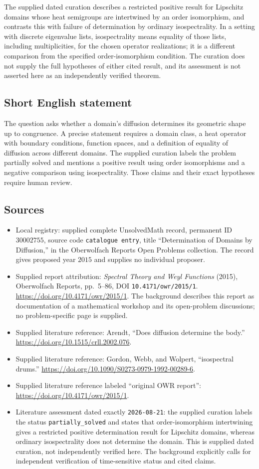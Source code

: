 \documentclass[11pt]{article}
\begin{document}
The supplied dated curation describes a restricted positive result for Lipschitz domains whose heat semigroups are intertwined by an order isomorphism, and contrasts this with failure of determination by ordinary isospectrality. In a setting with discrete eigenvalue lists, isospectrality means equality of those lists, including multiplicities, for the chosen operator realizations; it is a different comparison from the specified order-isomorphism condition. The curation does not supply the full hypotheses of either cited result, and its assessment is not asserted here as an independently verified theorem.
\subsection{Short English statement}
The question asks whether a domain's diffusion determines its geometric shape up to congruence. A precise statement requires a domain class, a heat operator with boundary conditions, function spaces, and a definition of equality of diffusion across different domains. The supplied curation labels the problem partially solved and mentions a positive result using order isomorphisms and a negative comparison using isospectrality. Those claims and their exact hypotheses require human review.
\subsection{Sources}
\begin{itemize}
\item Local registry: supplied complete UnsolvedMath record, permanent ID \(30002755\), source code \texttt{catalogue entry}, title ``Determination of Domains by Diffusion,'' in the Oberwolfach Reports Open Problems collection. The record gives proposed year \(2015\) and supplies no individual proposer.
\item Supplied report attribution: \emph{Spectral Theory and Weyl Functions} (2015), Oberwolfach Reports, pp.\ 5--86, DOI \texttt{10.4171/owr/2015/1}. \url{https://doi.org/10.4171/owr/2015/1}. The background describes this report as documentation of a mathematical workshop and its open-problem discussions; no problem-specific page is supplied.
\item Supplied literature reference: Arendt, ``Does diffusion determine the body.'' \url{https://doi.org/10.1515/crll.2002.076}.
\item Supplied literature reference: Gordon, Webb, and Wolpert, ``isospectral drums.'' \url{https://doi.org/10.1090/S0273-0979-1992-00289-6}.
\item Supplied literature reference labeled ``original OWR report'': \url{https://doi.org/10.4171/owr/2015/1}.
\item Literature assessment dated exactly \texttt{2026-08-21}: the supplied curation labels the status \texttt{partially\_solved} and states that order-isomorphism intertwining gives a restricted positive determination result for Lipschitz domains, whereas ordinary isospectrality does not determine the domain. This is supplied dated curation, not independently verified here. The background explicitly calls for independent verification of time-sensitive status and cited claims.
\end{itemize}
\end{document}
